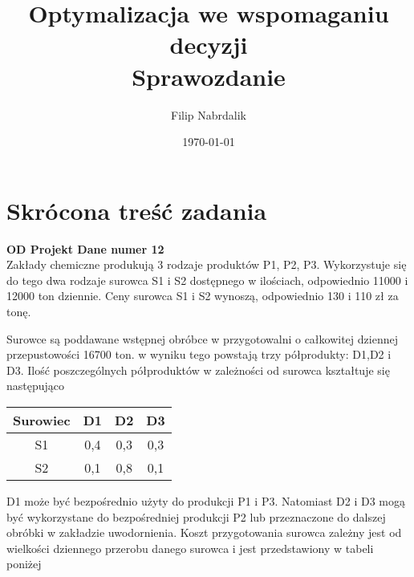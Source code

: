 \documentclass[a4paper, 10pt]{article}
\title{{\bf {Optymalizacja we wspomaganiu decyzji}} \\ {\large Sprawozdanie}}
\date{\today}
\author{Filip Nabrdalik}
\begin{document}




\maketitle 




\newcommand{\ang}[1]{(ang. {\em #1}\/)}
\newcommand{\e}[1]{{\em #1}\/}





\section{Skrócona treść zadania}

{\bf OD Projekt \hfill Dane numer 12\\}
Zakłady chemiczne produkują 3 rodzaje produktów P1, P2, P3. Wykorzystuje się do tego dwa rodzaje surowca S1 i S2 dostępnego w ilościach,
odpowiednio 11000 i 12000 ton dziennie. Ceny surowca S1 i S2 wynoszą, odpowiednio 130 i 110 zł za tonę.

Surowce są poddawane wstępnej obróbce w przygotowalni o całkowitej dziennej przepustowości 16700 ton. 
w wyniku tego powstają trzy półprodukty: D1,D2 i D3. Ilość poszczególnych półproduktów w zależności 
od surowca kształtuje się następująco 

\begin{center}
    \begin{tabular}{ | c | c | c | c |}
    \hline
    Surowiec & D1 & D2 & D3 \\ \hline
	S1 & 0,4 & 0,3 & 0,3 \\ \hline
	S2 & 0,1 & 0,8 & 0,1 \\ \hline
    \end{tabular}
\end{center}


D1 może być bezpośrednio użyty do produkcji P1 i P3. Natomiast D2 i D3 mogą być wykorzystane
do bezpośredniej produkcji P2 lub przeznaczone do dalszej obróbki w zakładzie uwodornienia. Koszt przygotowania surowca zależny jest od wielkości 
dziennego przerobu danego surowca i jest przedstawiony w tabeli poniżej
\end{document}
